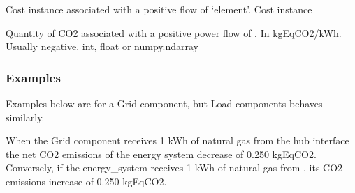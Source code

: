 \documentclass[letterpaper,10pt,english]{sphinxmanual}
\begin{document}
\begin{fulllineitems}
\begin{fulllineitems}
\label{\detokenize{generated/tamos.elementIO.Grid:tamos.elementIO.Grid.element_cost}}
\pysigstartsignatures
{}
\pysigstopsignatures
\sphinxAtStartPar
Cost instance associated with a positive flow of ‘element’.
Cost instance

\end{fulllineitems}


\begin{fulllineitems}
\label{\detokenize{generated/tamos.elementIO.Grid:tamos.elementIO.Grid.emissions}}
\pysigstartsignatures
{}
\pysigstopsignatures
\sphinxAtStartPar
Quantity of CO2 associated with a positive power flow of .
In kgEqCO2/kWh.
Usually negative.
int, float or numpy.ndarray
\subsubsection*{Examples}

\sphinxAtStartPar
Examples below are for a Grid component, but Load components behaves similarly.

\begin{sphinxVerbatim}[commandchars=\\\{\}]
  
   
\end{sphinxVerbatim}

\sphinxAtStartPar
When the Grid component  receives 1 kWh of natural gas from the hub interface
the net CO2 emissions of the energy system decrease of 0.250 kgEqCO2.
Conversely, if the energy\_system receives 1 kWh of natural gas from ,
its CO2 emissions increase of 0.250 kgEqCO2.

\begin{sphinxVerbatim}[commandchars=\\\{\}]
  
   
\end{sphinxVerbatim}


\end{fulllineitems}
\end{fulllineitems}
\end{document}
